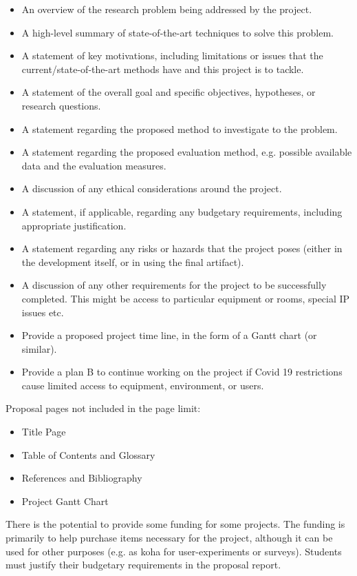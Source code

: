 \begin{itemize}
\item An overview of the research problem being addressed by the project.
\item A high-level summary of state-of-the-art techniques to solve this problem.
\item A statement of key motivations, including limitations or issues that the current/state-of-the-art methods have and this project is to tackle.
\item A statement of the overall goal and specific objectives, hypotheses, or research questions.
\item A statement regarding the proposed method to investigate to the problem.
\item A statement regarding the proposed evaluation method, e.g. possible available data and the evaluation measures.
\item A discussion of any ethical considerations around the project.
\item A statement, if applicable, regarding any budgetary requirements, including
  appropriate justification.
\item A statement regarding any risks or hazards that the project
  poses (either in the development itself, or in using the final
  artifact).
\item A discussion of any other requirements for the project to be successfully
completed. This might be access to particular equipment or rooms, special IP
issues etc.
\item Provide a proposed project time line, in the form of a Gantt chart (or similar).
\item Provide a plan B to continue working on the project if Covid 19 restrictions cause limited access to equipment, environment, or users.
\end{itemize}


{Proposal pages not included in the page limit:}
\begin{itemize}
	\item Title Page
	\item Table of Contents and Glossary
	\item References and Bibliography
	\item Project Gantt Chart
\end {itemize}

There is the potential to provide some funding for some projects.  
The funding is primarily to help purchase items
necessary for the project, although it can be used for other purposes
(e.g. as koha for user-experiments or surveys).  Students must justify their
budgetary requirements in the proposal report.

